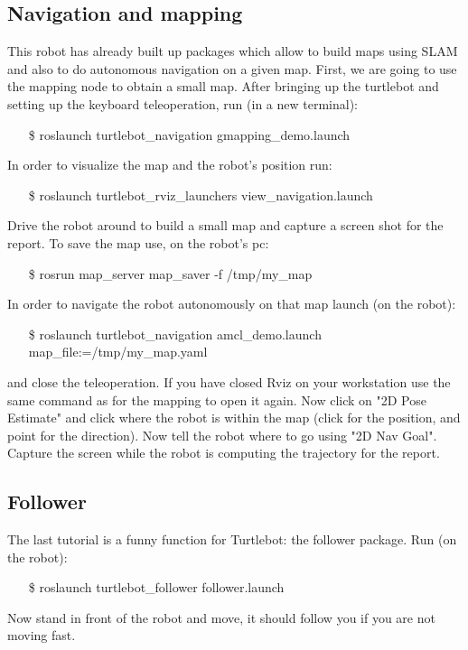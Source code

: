 \documentclass[a4paper,10pt]{article}
\begin{document}
\subsection{Navigation and mapping}
This robot has already built up packages which allow to build maps using SLAM and also to do autonomous navigation on a given map. First, we are going to use the mapping node to obtain a small map. After bringing up the turtlebot and setting up the keyboard teleoperation, run (in a new terminal):
\begin{shaded}
	\begin{itemize}
		\item[\$] roslaunch turtlebot\_navigation gmapping\_demo.launch
	\end{itemize}
\end{shaded}
In order to visualize the map and the robot's position run:
\begin{shaded}
	\begin{itemize}
		\item[\$] roslaunch turtlebot\_rviz\_launchers view\_navigation.launch
	\end{itemize}
\end{shaded}
Drive the robot around to build a small map and capture a screen shot for the report. To save the map use, on the robot's pc:
\begin{shaded}
	\begin{itemize}
		\item[\$] rosrun map\_server map\_saver -f /tmp/my\_map
	\end{itemize}
\end{shaded}

In order to navigate the robot autonomously on that map launch (on the robot):
\begin{shaded}
	\begin{itemize}
		\item[\$] roslaunch turtlebot\_navigation amcl\_demo.launch map\_file:=/tmp/my\_map.yaml
	\end{itemize}
\end{shaded}
and close the teleoperation. If you have closed Rviz on your workstation use the same command as for the mapping to open it again. Now click on "2D Pose Estimate" and click where the robot is within the map (click for the position, and point for the direction). Now tell the robot where to go using "2D Nav Goal". Capture the screen while the robot is computing the trajectory for the report.

\subsection{Follower}
The last tutorial is a funny function for Turtlebot: the follower package. Run (on the robot):
\begin{shaded}
	\begin{itemize}
		\item[\$] roslaunch turtlebot\_follower follower.launch
	\end{itemize}
\end{shaded}
Now stand in front of the robot and move, it should follow you if you are not moving fast.
\end{document}
